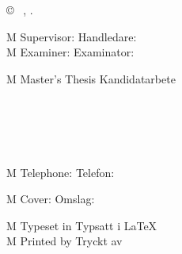 { %
\newpage
\thispagestyle{empty}
\vspace*{4.5cm}
\thesisImprintTitle\\
\thesisImprintSubtitle\\
\thesisAuthor \setlength{\parskip}{1cm}

\copyright ~ \thesisAuthor, \thesisYear. \setlength{\parskip}{1cm}

\if\thesisType M
    Supervisor:
\else
    Handledare:
\fi
\thesisSupervisor\\
\if\thesisType M
    Examiner:
\else
    Examinator:
\fi
\thesisExaminer \setlength{\parskip}{1cm}

\if\thesisType M
    Master's Thesis
\else
    Kandidatarbete
\fi
\thesisYear\\
\thesisDepartment\\
\thesisDivision\\
\ifx\thesisGroup\undefined
\else
\thesisGroup\\
\fi
\thesisUniversity\\
\thesisImprintLocation\\
\if\thesisType M
    Telephone:
\else
    Telefon:
\fi
\thesisUniversityTel \setlength{\parskip}{0.5cm}

\vfill
\ifx\thesisCoverFigure\undefined
\else
    \if\thesisType M
        Cover:
    \else
        Omslag:
    \fi
    \thesisCoverFigureCaption
    \setlength{\parskip}{0.5cm}
\fi

\if\thesisType M
    Typeset in
\else
    Typsatt i
\fi
\LaTeX\\
\ifx\thesisPrintedBy\undefined
\else
    \if\thesisType M
        Printed by
    \else
        Tryckt av
    \fi
    \thesisPrintedBy\\
\fi
\thesisLocation\ \thesisYear
}

